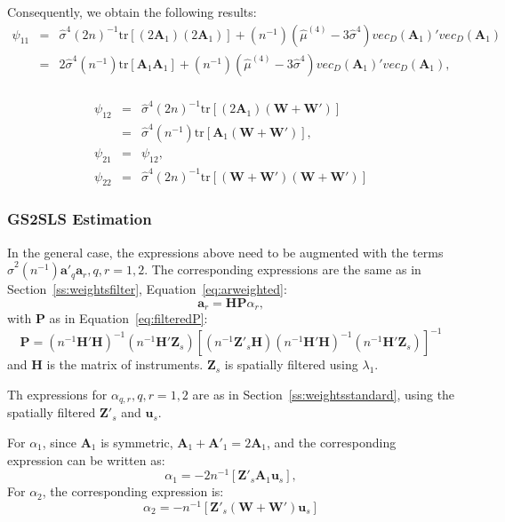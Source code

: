 \documentclass{article}
\begin{document}
Consequently, we obtain the following results:
\begin{eqnarray*}
 \psi_{11} &=& \hat{\sigma}^4 (2n)^{-1} \mbox{tr} [ (2 \mathbf{A}_1 ) (2 \mathbf{A}_1 ) ]
               + (n^{-1}) (\hat{\mu}^{(4)} - 3 \hat{\sigma}^4) vec_D(\mathbf{A}_1)'vec_D (\mathbf{A}_1) \\
        &=&  2  \hat{\sigma}^4 (n^{-1}) \mbox{tr} [ \mathbf{A}_1\mathbf{A}_1 ]
       + (n^{-1}) (\hat{\mu}^{(4)} - 3 \hat{\sigma}^4) vec_D(\mathbf{A}_1)'vec_D (\mathbf{A}_1) ,\\
\end{eqnarray*}
        
\begin{eqnarray*}
  \psi_{12} &=& \hat{\sigma}^4 (2n)^{-1} \mbox{tr} [ (2 \mathbf{A}_1 ) (\mathbf{W} + \mathbf{W'} ) ]\\
       &=& \hat{\sigma}^4 (n^{-1}) \mbox{tr} [  \mathbf{A}_1 (\mathbf{W} + \mathbf{W'} )  ],\\
   \psi_{21} &=& \psi_{12},\\
   \psi_{22} &=& \hat{\sigma}^4 (2n)^{-1} \mbox{tr} [ (\mathbf{W} + \mathbf{W'}) 
   (\mathbf{W} + \mathbf{W'}) ]
\end{eqnarray*}

\subsubsection{GS2SLS Estimation}
In the general case, the expressions above need to be augmented with 
the terms $ \hat{\sigma}^2 (n^{-1}) \mathbf{a'}_q \mathbf{a}_r, q, r = 1, 2$.
The corresponding expressions are the same as in Section~\ref{ss:weightsfilter},
Equation~\ref{eq:arweighted}:
\begin{equation*}
\mathbf{a}_r = \mathbf{HP} \alpha_r,
\end{equation*}
with $\mathbf{P}$
as in Equation~\ref{eq:filteredP}:
\begin{equation*}
\mathbf{P} = (n^{-1}\mathbf{H'H})^{-1} ( n^{-1} \mathbf{H'Z}_s ) 
        [ (n^{-1} \mathbf{Z'}_s \mathbf{H} ) (n^{-1} \mathbf{H'H} )^{-1} (n^{-1} \mathbf{H'Z}_s) ]^{-1}
\end{equation*}
and $\mathbf{H}$ is the matrix of instruments. $\mathbf{Z}_s$ is spatially filtered using $\lambda_1$.

Th expressions for $\alpha_{q,r}, q, r = 1,2$ are as in Section~\ref{ss:weightsstandard},
using the spatially filtered $\mathbf{Z'}_s$ and $\mathbf{u}_s$. 

For $\alpha_1$, since $\mathbf{A}_1$ is symmetric, $\mathbf{A}_1 + \mathbf{A'}_1 = 2 \mathbf{A}_1$, and the corresponding expression can be written as:
\begin{equation*}
\alpha_1 = - 2 n^{-1} [ \mathbf{Z'}_s \mathbf{A}_1 \mathbf{u}_s ],
\end{equation*}
 For $\alpha_2$, the corresponding expression is:
\begin{equation*}
 \alpha_2 = - n^{-1} [ \mathbf{Z'}_s (\mathbf{W} + \mathbf{W'} ) \mathbf{u}_s ]
\end{equation*}





\end{document}
